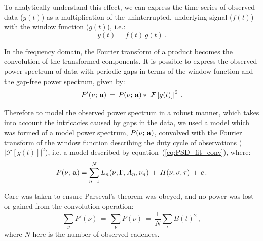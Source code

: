 To analytically understand this effect, we can express the time series of observed data ($y(t)$) as a multiplication of the uninterrupted, underlying signal ($f(t)$) with the window function ($g(t)$), i.e.:
%
\begin{equation}
y(t)  = f(t) \, g(t)
\label{eq:timeseries} \, .
\end{equation}

In the frequency domain, the Fourier transform of a product becomes the convolution of the transformed components. It is possible to express the observed power spectrum of data with periodic gaps in terms of the window function and the gap-free power spectrum, given by:
%
\begin{equation}
P'(\nu; \,{\bf a}) \, = \, P(\nu; \,{\bf a}) * \left|\mathcal{F}\left[g(t)\right]\right|^2 \, .
\label{eq:PSD_fit_conv}
\end{equation}

Therefore to model the observed power spectrum in a robust manner, which takes into account the intricacies caused by gaps in the data, we used a model which was formed of a model power spectrum, $P(\nu; \,{\bf a})$, convolved with the Fourier transform of the window function describing the duty cycle of observations ($\left|\mathcal{F}\left[g(t)\right]\right|^2$), i.e. a model described by equation~(\ref{eq:PSD_fit_conv}), where:
%
\begin{equation}
P(\nu; \,{\bf a}) = \sum_{n=1}^{N} L_n(\nu; \Gamma, A_n, \nu_n) \, + \, H(\nu; \sigma, \tau) \, + \, c \, .
\label{eq:PSD_model}
\end{equation}

Care was taken to ensure Parseval's theorem was obeyed, and no power was lost or gained from the convolution operation: 
%
\begin{equation}
\sum_{\nu} P'(\nu) \, = \,\sum_{\nu} P(\nu) \, = \, \frac{1}{N} \sum_{t}  B(t)^2 \, ,
\label{eq:parseval}
\end{equation}
%
where $N$ here is the number of observed cadences.




